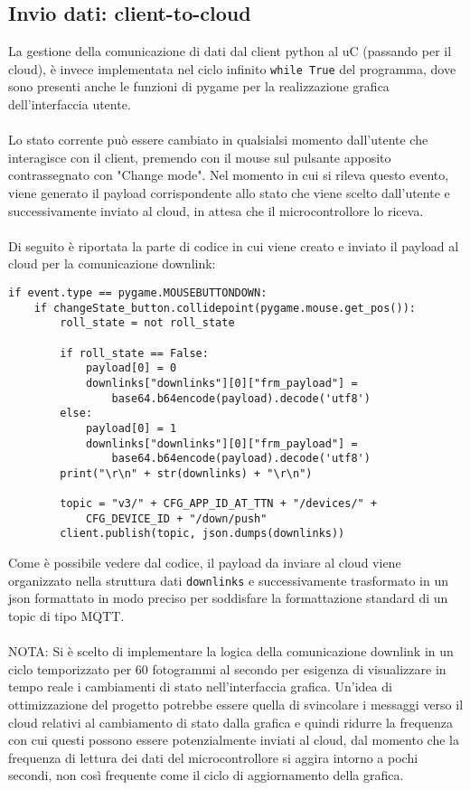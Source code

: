 \subsection{Invio dati: client-to-cloud}
La gestione della comunicazione di dati dal client python al uC (passando per il cloud), è invece implementata nel ciclo infinito \Verb|while True| 
del programma, dove sono presenti anche le funzioni di pygame per la realizzazione grafica dell'interfaccia utente.
\\\\Lo stato corrente può essere cambiato in qualsialsi momento dall'utente che interagisce con il client, premendo con il mouse sul pulsante
apposito contrassegnato con "Change mode". Nel momento in cui si rileva questo evento, viene generato il payload corrispondente allo stato che viene 
scelto dall'utente e successivamente inviato al cloud, in attesa che il microcontrollore lo riceva.
\\\\Di seguito è riportata la parte di codice in cui viene creato e inviato il payload al cloud per la comunicazione downlink:
\begin{verbatim}
if event.type == pygame.MOUSEBUTTONDOWN:
    if changeState_button.collidepoint(pygame.mouse.get_pos()):
        roll_state = not roll_state

        if roll_state == False:
            payload[0] = 0
            downlinks["downlinks"][0]["frm_payload"] = 
                base64.b64encode(payload).decode('utf8')
        else:
            payload[0] = 1
            downlinks["downlinks"][0]["frm_payload"] = 
                base64.b64encode(payload).decode('utf8')
        print("\r\n" + str(downlinks) + "\r\n")

        topic = "v3/" + CFG_APP_ID_AT_TTN + "/devices/" + 
            CFG_DEVICE_ID + "/down/push"
        client.publish(topic, json.dumps(downlinks))
\end{verbatim}
Come è possibile vedere dal codice, il payload da inviare al cloud viene organizzato nella struttura dati \Verb|downlinks| e successivamente trasformato in un json
formattato in modo preciso per soddisfare la formattazione standard di un topic di tipo MQTT.\\\\
NOTA: Si è scelto di implementare la logica della comunicazione downlink in un ciclo temporizzato per 60 fotogrammi al secondo per esigenza di 
visualizzare in tempo reale i cambiamenti di stato nell'interfaccia grafica. Un'idea di ottimizzazione del progetto potrebbe essere
quella di svincolare i messaggi verso il cloud relativi al cambiamento di stato dalla grafica e quindi ridurre la frequenza con cui questi possono essere potenzialmente
inviati al cloud, dal momento che la frequenza di lettura dei dati del microcontrollore si aggira intorno a pochi secondi, non così frequente come il ciclo di aggiornamento della grafica.


